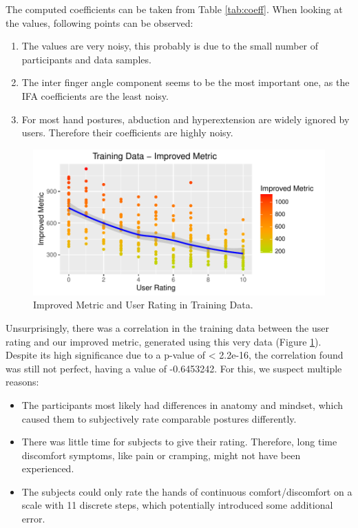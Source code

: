 The computed coefficients can be taken from Table \ref{tab:coeff}. When looking at the values, following points can be observed: 
\begin{enumerate}
	\item The values are very noisy, this probably is due to the small number of participants and data samples. 
	\item The inter finger angle component seems to be the most important one, as the IFA coefficients are the least noisy.
	\item For most hand postures, abduction and hyperextension are widely ignored by users. Therefore their coefficients are highly noisy. 
\end{enumerate}

\begin{figure}[h]
\centering
\includegraphics[width=\textwidth]{TrainingDataImproved}
\caption{Improved Metric and User Rating in Training Data.}
\label{fig:trainingData}
\end{figure}

Unsurprisingly, there was a correlation in the training data between the user rating and our improved metric, generated using this very data (Figure \ref{fig:trainingData}). Despite its high significance due to a p-value of < 2.2e-16, the correlation found was still not perfect, having a value of -0.6453242. For this, we suspect multiple reasons: 

\begin{itemize}
	\item The participants most likely had differences in anatomy and mindset, which caused them to subjectively rate comparable postures differently. 
	\item There was little time for subjects to give their rating. Therefore, long time discomfort symptoms, like pain or cramping, might not have been experienced. 
	\item The subjects could only rate the hands of continuous comfort/discomfort on a scale with 11 discrete steps, which potentially introduced some additional error.
\end{itemize}

